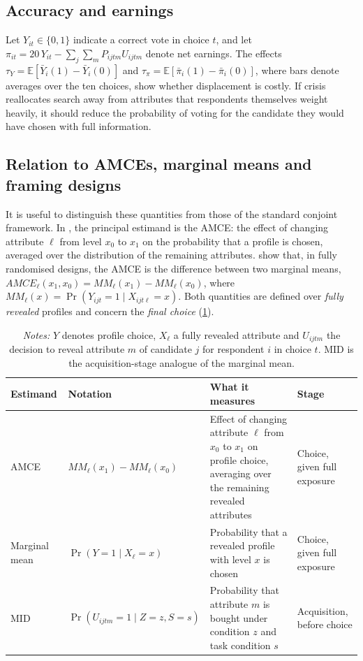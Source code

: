 \documentclass[11pt]{article}
\newcommand{\E}{\mathbb{E}}
\begin{document}
\subsection{Accuracy and earnings}

Let $Y_{it}\in\{0,1\}$ indicate a correct vote in choice $t$, and let $\pi_{it}=20\,Y_{it}-\sum_j\sum_m P_{ijtm}U_{ijtm}$ denote net earnings. The effects $\tau_Y=\E[\bar Y_i(1)-\bar Y_i(0)]$ and $\tau_\pi=\E[\bar\pi_i(1)-\bar\pi_i(0)]$, where bars denote averages over the ten choices, show whether displacement is costly. If crisis reallocates search away from attributes that respondents themselves weight heavily, it should reduce the probability of voting for the candidate they would have chosen with full information.

\subsection{Relation to AMCEs, marginal means and framing designs}

It is useful to distinguish these quantities from those of the standard conjoint framework. In \textcite{Hainmueller2014}, the principal estimand is the AMCE: the effect of changing attribute $\ell$ from level $x_0$ to $x_1$ on the probability that a profile is chosen, averaged over the distribution of the remaining attributes. \textcite{Leeper2020a} show that, in fully randomised designs, the AMCE is the difference between two marginal means, $\mathit{AMCE}_\ell(x_1,x_0)=\mathit{MM}_\ell(x_1)-\mathit{MM}_\ell(x_0)$, where $\mathit{MM}_\ell(x)=\Pr(Y_{ijt}=1\mid X_{ijt\ell}=x)$. Both quantities are defined over \emph{fully revealed} profiles and concern the \emph{final choice} (\cref{tab:estimands}).

\begin{table}[!htbp]
\centering
\caption{Standard conjoint estimands and the economic conjoint acquisition estimand}
\label{tab:estimands}
\footnotesize
\begin{tabularx}{\textwidth}{p{2.6cm} p{4.6cm} X p{2.6cm}}
\toprule
\textbf{Estimand} & \textbf{Notation} & \textbf{What it measures} & \textbf{Stage} \\
\midrule
AMCE \parencite{Hainmueller2014} & $\mathit{MM}_\ell(x_1)-\mathit{MM}_\ell(x_0)$ & Effect of changing attribute $\ell$ from $x_0$ to $x_1$ on profile choice, averaging over the remaining revealed attributes & Choice, given full exposure \\
Marginal mean \parencite{Leeper2020a} & $\Pr(Y=1\mid X_\ell=x)$ & Probability that a revealed profile with level $x$ is chosen & Choice, given full exposure \\
MID & $\Pr(U_{ijtm}=1\mid Z=z,S=s)$ & Probability that attribute $m$ is bought under condition $z$ and task condition $s$ & Acquisition, before choice \\
\bottomrule
\end{tabularx}
\caption*{\footnotesize\textit{Notes:} $Y$ denotes profile choice, $X_\ell$ a fully revealed attribute and $U_{ijtm}$ the decision to reveal attribute $m$ of candidate $j$ for respondent $i$ in choice $t$. MID is the acquisition-stage analogue of the marginal mean.}
\end{table}
\end{document}
